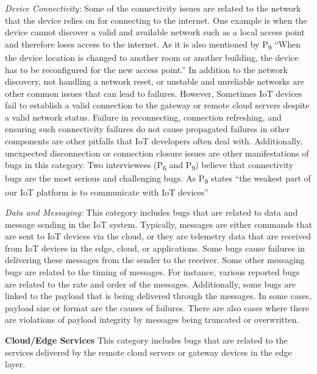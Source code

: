 \textit{Device Connectivity:} 
Some of the connectivity issues are related to the network that the device relies on for connecting to the internet. One example is when the device cannot discover a valid and available network such as a local access point and therefore loses access to the internet. As it is also mentioned by P\textsubscript{9} \enquote{When the device location is changed to another room or another building, the device has to be reconfigured for the new access point.}
In addition to the network discovery, not handling a network reset, or unstable and unreliable networks are other common issues that can lead to failures. However, Sometimes IoT devices fail to establish a valid connection to the gateway or remote cloud servers despite a valid network status. Failure in reconnecting, connection refreshing, and ensuring such connectivity failures do not cause propagated failures in other components are other pitfalls that IoT developers often deal with. Additionally, unexpected disconnection or connection closure issues are other manifestations of bugs in this category. Two interviewees (P\textsubscript{6} and P\textsubscript{9}) believe that connectivity bugs are the most serious and challenging bugs. As P\textsubscript{9} states \enquote{the weakest part of our IoT platform is to communicate with IoT devices}

\textit{Data and Messaging:}
This category includes bugs that are related to data and message sending in the IoT system. Typically, messages are either commands that are sent to IoT devices via the cloud, or they are telemetry data that are received from IoT devices in the edge, cloud, or applications. Some bugs cause failures in delivering these messages from the sender to the receiver. Some other messaging bugs are related to the timing of messages. For instance, various reported bugs are related to the rate and order of the messages. Additionally, some bugs are linked to the payload that is being delivered through the messages. In some cases, payload size or format are the causes of failures. There are also cases where there are violations of payload integrity by messages being truncated or overwritten.


\textbf{Cloud/Edge Services}
This category includes bugs that are related to the services delivered by the remote cloud servers or gateway devices in the edge layer. 


